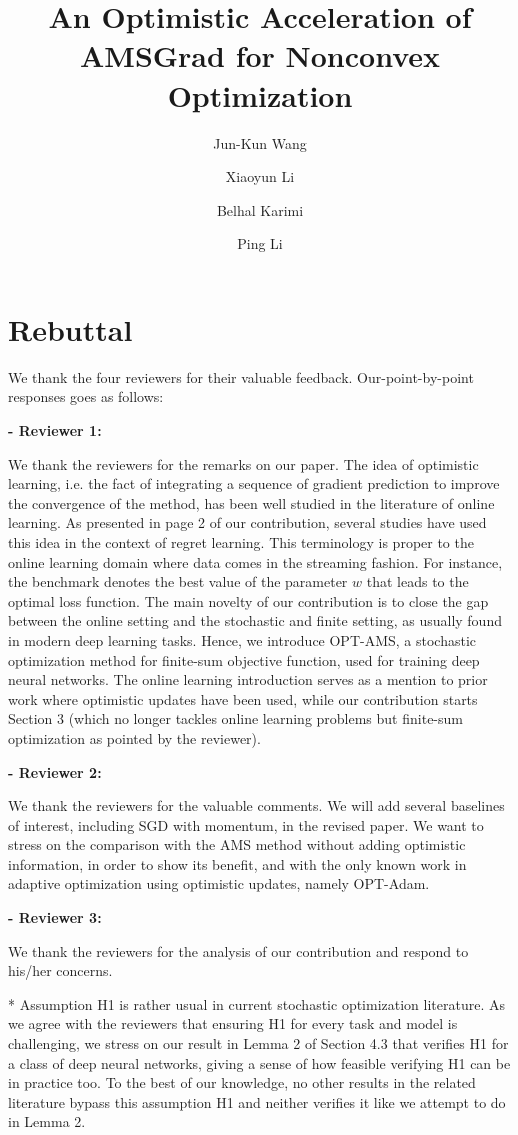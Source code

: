 \documentclass{article}
\title{An Optimistic Acceleration of AMSGrad for Nonconvex Optimization}
\author{Jun-Kun Wang \and Xiaoyun Li \and Belhal Karimi \and Ping Li}
\date{}
\begin{document}
\maketitle

\section{Rebuttal}

We thank the four reviewers for their valuable feedback. 
Our-point-by-point responses goes as follows:



\textbf{- Reviewer 1:}

We thank the reviewers for the remarks on our paper.
The idea of optimistic learning, i.e. the fact of integrating a sequence of gradient prediction to improve the convergence of the method, has been well studied in the literature of online learning. As presented in page 2 of our contribution, several studies have used this idea in the context of regret learning. This terminology is proper to the online learning domain where data comes in the streaming fashion. For instance, the benchmark denotes the best value of the parameter $w$ that leads to the optimal loss function.
The main novelty of our contribution is to close the gap between the online setting and the stochastic and finite setting, as usually found in modern deep learning tasks.
Hence, we introduce OPT-AMS, a stochastic optimization method for finite-sum objective function, used for training deep neural networks. 
The online learning introduction serves as a mention to prior work where optimistic updates have been used, while our contribution starts Section 3 (which no longer tackles online learning problems but finite-sum optimization as pointed by the reviewer).


\textbf{- Reviewer 2:}

We thank the reviewers for the valuable comments.
We will add several baselines of interest, including SGD with momentum, in the revised paper.
We want to stress on the comparison with the AMS method without adding optimistic information, in order to show its benefit, and with the only known work in adaptive optimization using optimistic updates, namely OPT-Adam.


\textbf{- Reviewer 3:}

We thank the reviewers for the analysis of our contribution and respond to his/her concerns.

* Assumption H1 is rather usual in current stochastic optimization literature.
As we agree with the reviewers that ensuring H1 for every task and model is challenging, we stress on our result in Lemma 2 of Section 4.3 that verifies H1 for a class of deep neural networks, giving a sense of how feasible verifying H1 can be in practice too.
To the best of our knowledge, no other results in the related literature bypass this assumption H1 and neither verifies it like we attempt to do in Lemma 2.
\end{document}
